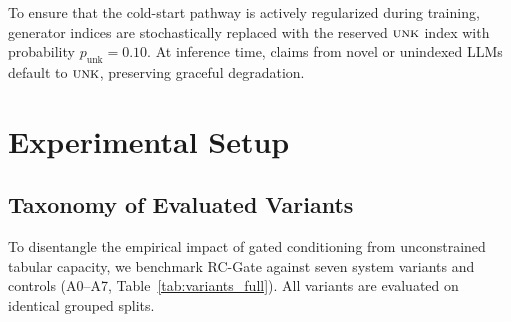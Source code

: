 \documentclass[pdflatex,sn-mathphys,Numbered]{sn-jnl}
\begin{document}
To ensure that the cold-start pathway is actively regularized during training, generator indices are stochastically replaced with the reserved $\textsc{unk}$ index with probability $p_{\mathrm{unk}} = 0.10$. At inference time, claims from novel or unindexed LLMs default to $\textsc{unk}$, preserving graceful degradation.

\section{Experimental Setup}\label{sec:setup}

\subsection{Taxonomy of Evaluated Variants}\label{subsec:variants}

To disentangle the empirical impact of gated conditioning from unconstrained tabular capacity, we benchmark RC-Gate against seven system variants and controls (A0--A7, Table~\ref{tab:variants_full}). All variants are evaluated on identical grouped splits.
\end{document}
